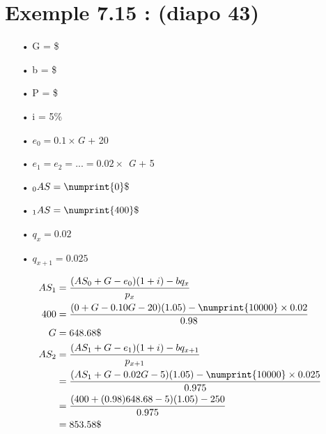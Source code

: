 \documentclass[11pt,french]{report}
\newcommand{\indiceGauche}[2]{{\vphantom{#2}}_{#1}#2}
\begin{document}
\section{Exemple 7.15 : (diapo 43)}
\begin{itemize}
\item[•] G = \$
\item[•] b = \$
\item[•] P = \$
\item[•] i = 5\%
\item[•] $e_0 = 0.1 \times $\textit{G} + 20 
\item[•] $e_1 = e_2 = ...= 0.02 \times$ \textit{G} + 5
\item[•] $\indiceGauche{0}{AS} = \numprint{0}\$ $
\item[•] $\indiceGauche{1}{AS} = \numprint{400}\$ $
\item[•] $q_{x} = 0.02 $
\item[•] $q_{x+1} = 0.025 $
\end{itemize}
\begin{align*}
AS_{1} &= \frac{(AS_{0} + G - e_{0}) (1 + i) - b q_{x}}{p_{x}} \\
400 &= \frac{(0+G-0.10G-20) (1.05) - \numprint{10000}\times 0.02}{0.98} \\
G &= 648.68\$\\
AS_{2} &= \frac{(AS_{1} + G - e_{1}) (1 + i) - b q_{x+1}}{p_{x+1}} \\
&= \frac{(AS_{1} + G -0.02G - 5) (1.05) - \numprint{10000} \times 0.025}{0.975} \\
&= \frac{(400 +(0.98)648.68  - 5) (1.05) - 250}{0.975} \\
&= 853.58\$
\end{align*}
\end{document}
